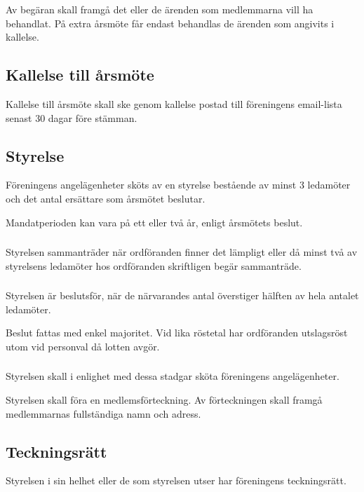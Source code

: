 \documentclass[11pt, a4paper]{article}
\begin{document}
Av begäran skall framgå det eller de ärenden som medlemmarna vill ha behandlat. På extra årsmöte får endast behandlas de ärenden som angivits i kallelse.

\subsection{Kallelse till årsmöte}
Kallelse till årsmöte skall ske genom kallelse postad till föreningens email-lista senast 30 dagar före stämman.

\subsection{Styrelse}
Föreningens angelägenheter sköts av en styrelse bestående av minst 3 ledamöter och det antal ersättare som årsmötet beslutar.

Mandatperioden kan vara på ett eller två år, enligt årsmötets beslut.

\subsubsection{}
Styrelsen sammanträder när ordföranden finner det lämpligt eller då minst två av styrelsens ledamöter hos ordföranden skriftligen begär sammanträde.

\subsubsection{}
Styrelsen är beslutsför, när de närvarandes antal överstiger hälften av hela antalet ledamöter.

Beslut fattas med enkel majoritet. Vid lika röstetal har ordföranden utslagsröst utom vid personval då lotten avgör.

\subsubsection{}
Styrelsen skall i enlighet med dessa stadgar sköta föreningens angelägenheter.

Styrelsen skall föra en medlemsförteckning. Av förteckningen skall framgå medlemmarnas fullständiga namn och adress.

\subsection{Teckningsrätt}
Styrelsen i sin helhet eller de som styrelsen utser har föreningens teckningsrätt.
\end{document}

